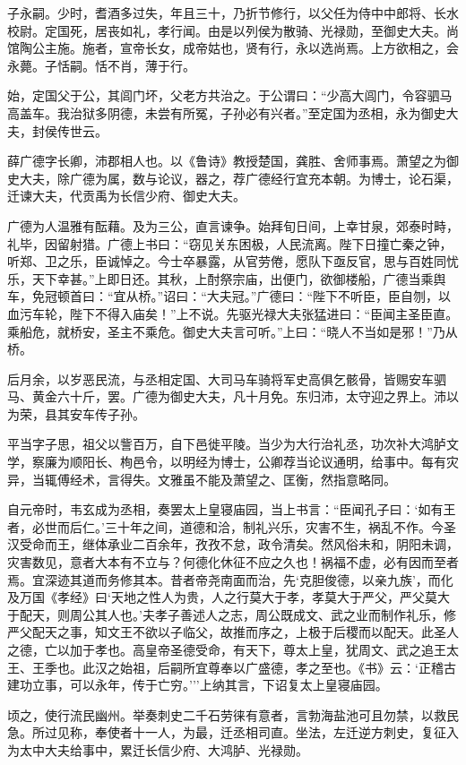 \documentclass[]{article}
\begin{document}
子永嗣。少时，耆酒多过失，年且三十，乃折节修行，以父任为侍中中郎将、长水校尉。定国死，居丧如礼，孝行闻。由是以列侯为散骑、光禄勋，至御史大夫。尚馆陶公主施。施者，宣帝长女，成帝姑也，贤有行，永以选尚焉。上方欲相之，会永薨。子恬嗣。恬不肖，薄于行。

始，定国父于公，其闾门坏，父老方共治之。于公谓曰：``少高大闾门，令容驷马高盖车。我治狱多阴德，未尝有所冤，子孙必有兴者。''至定国为丞相，永为御史大夫，封侯传世云。

薛广德字长卿，沛郡相人也。以《鲁诗》教授楚国，龚胜、舍师事焉。萧望之为御史大夫，除广德为属，数与论议，器之，荐广德经行宜充本朝。为博士，论石渠，迁谏大夫，代贡禹为长信少府、御史大夫。

广德为人温雅有酝藉。及为三公，直言谏争。始拜旬日间，上幸甘泉，郊泰时畤，礼毕，因留射猎。广德上书曰：``窃见关东困极，人民流离。陛下日撞亡秦之钟，听郑、卫之乐，臣诚悼之。今士卒暴露，从官劳倦，愿队下亟反官，思与百姓同忧乐，天下幸甚。''上即日还。其秋，上酎祭宗庙，出便门，欲御楼船，广德当乘舆车，免冠顿首曰：``宜从桥。''诏曰：``大夫冠。''广德曰：``陛下不听臣，臣自刎，以血污车轮，陛下不得入庙矣！''上不说。先驱光禄大夫张猛进曰：``臣闻主圣臣直。乘船危，就桥安，圣主不乘危。御史大夫言可听。''上曰：``晓人不当如是邪！''乃从桥。

后月余，以岁恶民流，与丞相定国、大司马车骑将军史高俱乞骸骨，皆赐安车驷马、黄金六十斤，罢。广德为御史大夫，凡十月免。东归沛，太守迎之界上。沛以为荣，县其安车传子孙。

平当字子思，祖父以訾百万，自下邑徙平陵。当少为大行治礼丞，功次补大鸿胪文学，察廉为顺阳长、栒邑令，以明经为博士，公卿荐当论议通明，给事中。每有灾异，当辄傅经术，言得失。文雅虽不能及萧望之、匡衡，然指意略同。

自元帝时，韦玄成为丞相，奏罢太上皇寝庙园，当上书言：``臣闻孔子曰：`如有王者，必世而后仁。'三十年之间，道德和洽，制礼兴乐，灾害不生，祸乱不作。今圣汉受命而王，继体承业二百余年，孜孜不怠，政令清矣。然风俗未和，阴阳未调，灾害数见，意者大本有不立与？何德化休征不应之久也！祸福不虚，必有因而至者焉。宜深迹其道而务修其本。昔者帝尧南面而治，先`克胆俊德，以亲九族'，而化及万国《孝经》曰`天地之性人为贵，人之行莫大于孝，孝莫大于严父，严父莫大于配天，则周公其人也。'夫孝子善述人之志，周公既成文、武之业而制作礼乐，修严父配天之事，知文王不欲以子临父，故推而序之，上极于后稷而以配天。此圣人之德，亡以加于孝也。高皇帝圣德受命，有天下，尊太上皇，犹周文、武之追王太王、王季也。此汉之始祖，后嗣所宜尊奉以广盛德，孝之至也。《书》云：`正稽古建功立事，可以永年，传于亡穷。'''上纳其言，下诏复太上皇寝庙园。

顷之，使行流民幽州。举奏刺史二千石劳徕有意者，言勃海盐池可且勿禁，以救民急。所过见称，奉使者十一人，为最，迁丞相司直。坐法，左迁逆方刺史，复征入为太中大夫给事中，累迁长信少府、大鸿胪、光禄勋。
\end{document}
